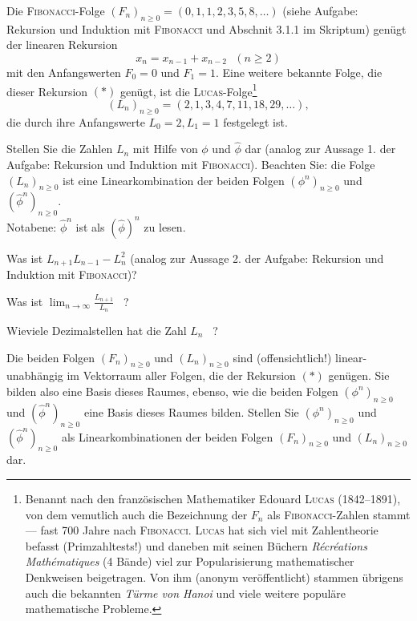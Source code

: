 Die \textsc{Fibonacci}-Folge $(F_n)_{n \geq 0} = (0,1,1,2,3,5,8,\ldots)$ (siehe
Aufgabe: Rekursion und Induktion mit \textsc{Fibonacci} und Abschnit 3.1.1 im
Skriptum) genügt der linearen Rekursion
\begin{equation*}
x_{n} = x_{n-1} + x_{n-2}~~~(n \geq 2) \tag{$*$}
\end{equation*}
mit den Anfangswerten $F_0=0$ und $F_1=1$. Eine weitere bekannte Folge, die dieser Rekursion $(*)$
genügt, ist die \textsc{Lucas}-Folge\footnote{
Benannt nach den französischen Mathematiker Edouard \textsc{Lucas}
(1842--1891), von dem vemutlich auch die Bezeichnung der $F_n$ als
\textsc{Fibonacci}-Zahlen stammt --- fast 700 Jahre nach \textsc{Fibonacci}. 
\textsc{Lucas} hat sich viel mit Zahlentheorie befasst (Primzahltests!) und
daneben mit seinen Büchern \emph{R\'ecr\'eations Math\'ematiques} (4 Bände)
viel zur Popularisierung mathematischer Denkweisen beigetragen. Von ihm (anonym
veröffentlicht) stammen übrigens auch die bekannten \emph{Türme von Hanoi} und
viele weitere populäre mathematische Probleme.}
\[
(L_n)_{n \geq 0} = (2,1,3,4,7,11,18,29, \ldots),
\]
die durch ihre Anfangswerte $L_0=2, L_1=1$ festgelegt ist.

\begin{flushenum}
\item Stellen Sie die Zahlen $L_n$ mit Hilfe von $\phi$ und $\widehat{\phi}$ dar (analog zur Aussage
	1. der Aufgabe: Rekursion und Induktion mit \textsc{Fibonacci}).
	Beachten Sie: die Folge $(L_n)_{n \geq 0}$ ist eine Linearkombination
	der beiden Folgen $(\phi^n)_{n \geq 0}$ und  $(\widehat{\phi}^n)_{n \geq 0}$.\\
	Notabene: $\widehat{\phi}^n$ ist als $\left( \widehat{\phi} \right)^n$ zu lesen.
\item Was ist $L_{n+1} L_{n-1} - L_n^2$ (analog  zur Aussage 2. der Aufgabe:
	Rekursion und Induktion mit \textsc{Fibonacci})?
\item Was ist $\lim_{n \rightarrow \infty} \frac{L_{n+1}}{L_n}$ ~?
\item Wieviele Dezimalstellen hat die Zahl $L_n$ ~?
\item Die beiden Folgen $(F_n)_{n \geq 0}$ und $(L_n)_{n \geq 0}$ sind (offensichtlich!)
	linear-unabhängig im Vektorraum aller Folgen, die der Rekursion $(*)$ genügen. 
	Sie bilden also eine Basis dieses Raumes, ebenso, wie die beiden
	Folgen $(\phi^n)_{n \geq 0}$ und $(\widehat{\phi}^n)_{n \geq 0}$ eine Basis dieses
	Raumes bilden. Stellen Sie  $(\phi^n)_{n \geq 0}$ und $(\widehat{\phi}^n)_{n \geq 0}$
	als Linearkombinationen der beiden Folgen $(F_n)_{n \geq 0}$ und $(L_n)_{n \geq 0}$ dar.
\end{flushenum}
